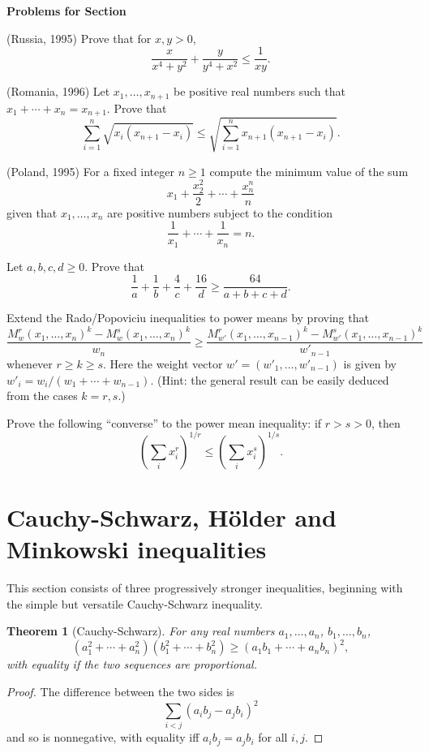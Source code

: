 \documentclass[12pt]{report}
\newtheorem{theorem}{Theorem}
\def\Lp{\left(}
\def\Rp{\right)}
\def\ii{\item}
\newcounter{exc}
\numberwithin{exc}{section}
\newenvironment{exer}{\vspace{0.1in}
\noindent \textbf{Problems for Section~\thesection} \vspace{0.1in}
\begin{list}{\arabic{exc}.}{\usecounter{exc}}}{\end{list}}
\begin{document}
\begin{exer}
	\ii (Russia, 1995)
	Prove that for $x,y > 0$,
	\[
	\frac{x}{x^{4} + y^{2}} + \frac{y}{y^{4} + x^{2}} \leq \frac{1}{xy}.
	\]
	\ii (Romania, 1996)
	Let $x_{1}, \dots, x_{n+1}$ be positive real numbers such that 
	$x_{1} + \cdots + x_{n} = x_{n+1}$. Prove that
	\[
	\sum_{i=1}^{n} \sqrt{x_{i}(x_{n+1}-x_{i})} \leq \sqrt{\sum_{i=1}^{n} 
	x_{n+1}(x_{n+1}-x_{i})}.
	\]
\ii
(Poland, 1995)
For a fixed integer $n \geq 1$ compute the minimum value of the sum
\[
x_{1} + \frac{x_{2}^{2}}{2} + \cdots + \frac{x_{n}^{n}}{n}
\]
given that $x_{1}, \dots, x_{n}$ are positive numbers subject to the 
condition
\[
\frac{1}{x_{1}} + \cdots + \frac{1}{x_{n}} = n.
\]
\ii Let $a,b,c,d\geq0$.  Prove that 
\[\frac 1a+\frac 1b+\frac 4c + \frac{16}{d}\geq\frac{64}{a+b+c+d}.\]
\ii
Extend the Rado/Popoviciu inequalities to power means by proving that
\[
\frac{M^{r}_{w}(x_{1}, \dots, x_{n})^{k} - M^{s}_{w}(x_{1}, \dots, 
x_{n})^{k}}{w_n} \geq \frac{M^{r}_{w'}(x_{1}, \dots, x_{n-1})^{k} -
M^{s}_{w'}(x_{1}, \dots, x_{n-1})^{k}}{w'_{n-1}}
\]
whenever $r \geq k \geq s$. Here the weight vector $w' = (w'_1, \dots, w'_{n-1})$
is given by $w'_i = w_i/(w_1 + \cdots + w_{n-1})$.
(Hint: the general result can be easily 
deduced from the cases $k=r,s$.)
\ii
Prove the following ``converse'' to the power mean inequality: if $r >
s> 0$, then
\[\Lp\sum_i x_i^r\Rp^{1/r} \leq\Lp\sum_i x_i^s\Rp^{1/s}.\]
\end{exer}

\section{Cauchy-Schwarz, H\"older and Minkowski inequalities}
This section consists of three progressively stronger inequalities, 
beginning with the simple but versatile
Cauchy-Schwarz inequality.
\begin{theorem}[Cauchy-Schwarz]
For any real numbers 
$a_{1}, \dots, a_{n}$, $b_{1}, \dots, b_{n}$,
	\[
	(a_{1}^{2} + \cdots + a_{n}^{2})(b_{1}^{2} + \cdots + b_{n}^{2})
	\geq (a_{1}b_{1} + \cdots + a_{n}b_{n})^{2},
	\]
with equality if the two sequences are proportional.
\end{theorem}
\begin{proof}
The difference between the two sides is
\[
\sum_{i<j} (a_{i}b_{j} - a_{j}b_{i})^{2}
\]
and so is nonnegative, with equality iff $a_{i}b_{j} = a_{j}b_{i}$ for 
all $i,j$.
\end{proof}
\end{document}
